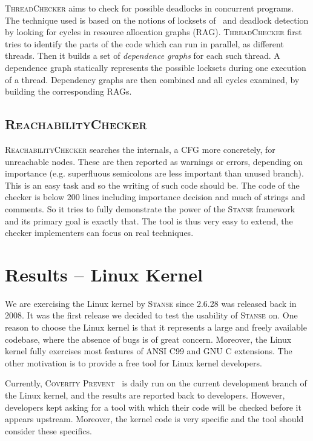 \documentclass[10pt]{llncs}
\newcommand{\Stanse}{\textsc{Stanse}\xspace}
\newcommand{\TC}{\textsc{ThreadChecker}\xspace}
\newcommand{\RC}{\textsc{ReachabilityChecker}\xspace}
\begin{document}
\TC aims to check for possible deadlocks in concurrent programs. The technique used is based on the notions of locksets of~\cite{relay} and deadlock detection by looking for cycles in resource allocation graphs (RAG). \TC first tries to identify the parts of the code which can run in parallel, as different threads. Then it builds a set of \emph{dependence graphs} for each such thread. A dependence graph statically represents the possible locksets during one execution of a thread. Dependency graphs are then combined and all cycles examined, by building the corresponding RAGs.

\subsection{\RC}

\RC searches the internals, a CFG more concretely, for unreachable nodes. These are then reported as warnings or errors, depending on importance (e.g. superfluous semicolons are less important than unused branch). This is an easy task and so the writing of such code should be. The code of the checker is below 200 lines including importance decision and much of strings and comments. So it tries to fully demonstrate the power of the \Stanse framework and its primary goal is exactly that. The tool is thus very easy to extend, the checker implementers can focus on real techniques.


\section{Results -- Linux Kernel}
\label{sec:results}

We are exercising the Linux kernel by \Stanse since 2.6.28 was released back
in 2008. It was the first release we decided to test the usability of \Stanse
on. One reason to choose the Linux kernel is that it represents a large and
freely available codebase, where the absence of bugs is of great concern.
Moreover, the Linux kernel fully exercises most features of ANSI C99 and GNU C
extensions. The other motivation is to provide a free tool for Linux kernel
developers.

Currently, \textsc{Coverity Prevent}~\cite{coverity} is daily run on the
current development branch of the Linux kernel, and the results are reported
back to developers. However, developers kept asking for a tool with which
their code will be checked before it appears upstream. Moreover, the kernel
code is very specific and the tool should consider these specifics.
\end{document}
